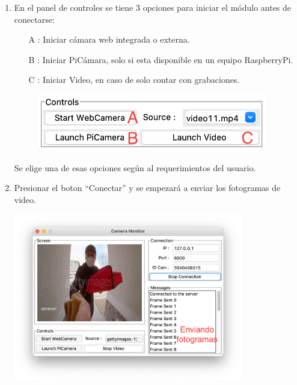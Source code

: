 \begin{enumerate}
    \item En el panel de controles se tiene 3 opciones para iniciar el módulo antes de conectarse:
        \begin{itemize}
            \item[A]: Iniciar cámara web integrada o externa.
            \item[B]: Iniciar PiCámara, solo si esta disponible en un equipo RaspberryPi.
            \item[C]: Iniciar Video, en caso de solo contar con grabaciones.  
        \end{itemize}
    \begin{figure}[H]
        \begin{center}
            \includegraphics[width=10cm]{img/anexos/controls_camera.png}
        \end{center}
    \end{figure}
    Se elige una de esas opciones según al requerimientos del usuario.
    \item Presionar el boton ``Conectar'' y se empezará a enviar los fotogramas de video.
    \begin{center}
        \includegraphics[width=10cm]{img/anexos/send_frames.png}
    \end{center}
    
\end{enumerate}


